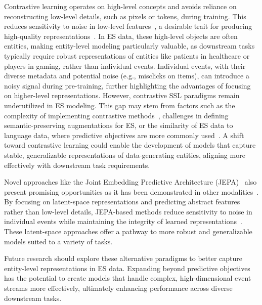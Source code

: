 \documentclass[twoside,11pt]{article}
\begin{document}
Contrastive learning operates on high-level concepts and avoids reliance on reconstructing low-level details, such as pixels or tokens, during training. This reduces sensitivity to noise in low-level features~, a desirable trait for producing high-quality representations~. In ES data, these high-level objects are often entities, making entity-level modeling particularly valuable, as downstream tasks typically require robust representations of entities like patients in healthcare or players in gaming, rather than individual events. Individual events, with their diverse metadata and potential noise (e.g., misclicks on items), can introduce a noisy signal during pre-training, further highlighting the advantages of focusing on higher-level representations. However, contrastive SSL paradigms remain underutilized in ES modeling. This gap may stem from factors such as the complexity of implementing contrastive methods~, challenges in defining semantic-preserving augmentations for ES, or the similarity of ES data to language data, where predictive objectives are more commonly used~. A shift toward contrastive learning could enable the development of models that capture stable, generalizable representations of data-generating entities, aligning more effectively with downstream task requirements.

Novel approaches like the Joint Embedding Predictive Architecture (JEPA)~ also present promising opportunities as it has been demonstrated in other modalities~. By focusing on latent-space representations and predicting abstract features rather than low-level details, JEPA-based methods reduce sensitivity to noise in individual events while maintaining the integrity of learned representations~. These latent-space approaches offer a pathway to more robust and generalizable models suited to a variety of tasks.

Future research should explore these alternative paradigms to better capture entity-level representations in ES data. Expanding beyond predictive objectives has the potential to create models that handle complex, high-dimensional event streams more effectively, ultimately enhancing performance across diverse downstream tasks.
\end{document}
